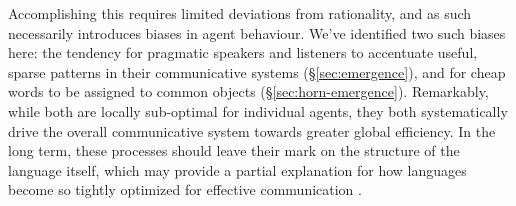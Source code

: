 \documentclass{article} %
\begin{document}
Accomplishing this requires limited deviations from rationality, and
as such necessarily introduces biases in agent behaviour. We've
identified two such biases here: the tendency for pragmatic speakers
and listeners to accentuate useful, sparse patterns in their
communicative systems (\S\ref{sec:emergence}), and for cheap words to
be assigned to common objects (\S\ref{sec:horn-emergence}).
Remarkably, while both are locally sub-optimal for individual agents,
they both systematically drive the overall communicative system
towards greater global efficiency. In the long term, these processes
should leave their mark on the structure of the language itself, which
may provide a partial explanation for how languages become so tightly
optimized for effective communication \cite{zipf1936,piantadosi2011}.








\newpage
\small


\end{document}
